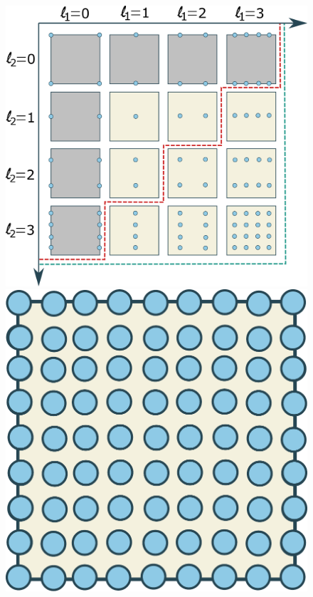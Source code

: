 \documentclass[
  a4paper,  %
  twoside,  %
  bibliography=totoc,
  headsepline,
  cleardoublepage=empty,
  parskip=half,
  draft=false
]{scrbook}
\begin{document}
\newpage
\begin{mdframed}[style=style]
\vspace{2.5mm}
\begin{figure}[H]
        \centering
\begin{minipage}{.71\textwidth}
        \centering
  \includegraphics[width=.8\linewidth]{graphics/grid_subspaces}
    \end{minipage}%
    \begin{minipage}{0.28\textwidth}
        \centering
  \includegraphics[width=.8\linewidth]{graphics/full_grid}
\vspace{4.5mm}

\end{minipage}
\end{figure}
\end{mdframed}
\end{document}
